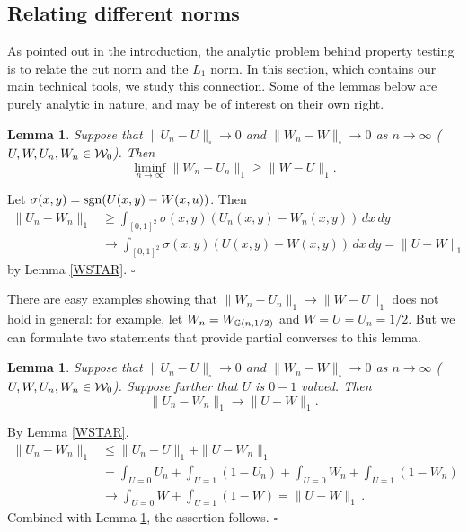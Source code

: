 \documentclass{article}
\newtheorem{lemma}[theorem]{Lemma}
\newenvironment{proof}{\medskip\noindent{\bf Proof. }}{\hfill$\square$\medskip}
\begin{document}
\subsection{Relating different norms}\label{RELATE-NORMS}

As pointed out in the introduction, the analytic problem behind
property testing is to relate the cut norm and the $L_1$ norm. In
this section, which contains our main technical tools, we study this
connection. Some of the lemmas below are purely analytic in nature,
and may be of interest on their own right.

\begin{lemma}\label{fura1}
Suppose that $\|U_n-U\|_\square\to 0$ and $\|W_n-W\|_\square\to 0$ as
$n\to\infty$ ($U,W,U_n,W_n\in\mathcal{W}_0$). Then
\[
\liminf_{n\to\infty} \|W_n-U_n\|_1\ge \|W-U\|_1.
\]
\end{lemma}

\begin{proof}
Let $\sigma(x,y)=\hbox{\rm sgn}(U(x,y)-W(x,u))$. Then
\begin{align*}
\|U_n-W_n\|_1 & \ge  \int_{[0,1]^2}
\sigma(x,y)(U_n(x,y)-W_n(x,y))\,dx\,dy\\
&\longrightarrow\int_{[0,1]^2} \sigma(x,y)(U(x,y)-W(x,y))\,dx\,dy
=\|U-W\|_1
\end{align*}
by Lemma \ref{WSTAR}.
\end{proof}

There are easy examples showing that $\|W_n-U_n\|_1\to \|W-U\|_1$
does not hold in general: for example, let $W_n=W_{{\mathbb G}(n,1/2)}$ and
$W=U=U_n=1/2$. But we can formulate two statements that provide
partial converses to this lemma.

\begin{lemma}\label{REV-CONV}
Suppose that $\|U_n-U\|_\square\to 0$ and $\|W_n-W\|_\square\to 0$ as
$n\to\infty$ ($U,W,U_n,W_n\in\mathcal{W}_0$). Suppose further that $U$ is
$0-1$ valued. Then
\[
\|U_n-W_n\|_1 \to \|U-W\|_1.
\]
\end{lemma}

\begin{proof}
By Lemma \ref{WSTAR},
\begin{align*}
\|U_n-W_n\|_1&\le \|U_n-U\|_1+\|U-W_n\|_1\\
&=\int_{U=0} U_n +\int_{U=1} (1-U_n)+ \int_{U=0} W_n +\int_{U=1} (1-W_n)\\
&\to\int_{U=0} W +\int_{U=1} (1-W)=\|U-W\|_1\,.
\end{align*}
Combined with Lemma \ref{fura1}, the assertion follows.
\end{proof}
\end{document}
